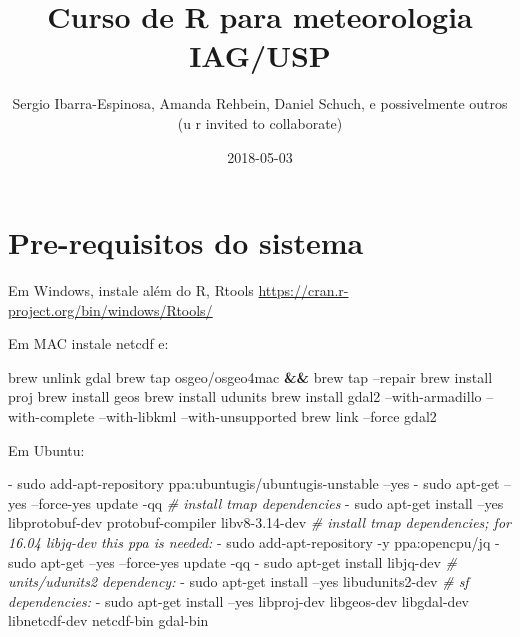 \documentclass[]{book}
\title{Curso de R para meteorologia IAG/USP}
\author{Sergio Ibarra-Espinosa, Amanda Rehbein, Daniel Schuch, e possivelmente
outros (u r invited to collaborate)}
\date{2018-05-03}
\newenvironment{Shaded}{\begin{snugshade}}{\end{snugshade}}
\newcommand{\KeywordTok}[1]{\textcolor[rgb]{0.13,0.29,0.53}{\textbf{#1}}}
\newcommand{\CommentTok}[1]{\textcolor[rgb]{0.56,0.35,0.01}{\textit{#1}}}
\newcommand{\ExtensionTok}[1]{#1}
\newcommand{\NormalTok}[1]{#1}
\begin{document}
\maketitle

{
\setcounter{tocdepth}{1}
\tableofcontents
}
\chapter{Pre-requisitos do sistema}\label{primero}

Em Windows, instale além do R, Rtools
\url{https://cran.r-project.org/bin/windows/Rtools/}

Em MAC instale netcdf e:

\begin{Shaded}
\begin{Highlighting}[]
\ExtensionTok{brew}\NormalTok{ unlink gdal}
\ExtensionTok{brew}\NormalTok{ tap osgeo/osgeo4mac }\KeywordTok{&&} \ExtensionTok{brew}\NormalTok{ tap --repair}
\ExtensionTok{brew}\NormalTok{ install proj}
\ExtensionTok{brew}\NormalTok{ install geos}
\ExtensionTok{brew}\NormalTok{ install udunits}
\ExtensionTok{brew}\NormalTok{ install gdal2 --with-armadillo --with-complete --with-libkml --with-unsupported}
\ExtensionTok{brew}\NormalTok{ link --force gdal2}
\end{Highlighting}
\end{Shaded}

Em Ubuntu:

\begin{Shaded}
\begin{Highlighting}[]
  \ExtensionTok{-}\NormalTok{ sudo add-apt-repository ppa:ubuntugis/ubuntugis-unstable --yes}
  \ExtensionTok{-}\NormalTok{ sudo apt-get --yes --force-yes update -qq}
  \CommentTok{# install tmap dependencies}
  \ExtensionTok{-}\NormalTok{ sudo apt-get install --yes libprotobuf-dev protobuf-compiler libv8-3.14-dev}
  \CommentTok{# install tmap dependencies; for 16.04 libjq-dev this ppa is needed:}
  \ExtensionTok{-}\NormalTok{ sudo add-apt-repository -y ppa:opencpu/jq}
  \ExtensionTok{-}\NormalTok{ sudo apt-get --yes --force-yes update -qq}
  \ExtensionTok{-}\NormalTok{ sudo apt-get install libjq-dev}
  \CommentTok{# units/udunits2 dependency:}
  \ExtensionTok{-}\NormalTok{ sudo apt-get install --yes libudunits2-dev}
  \CommentTok{# sf dependencies:}
  \ExtensionTok{-}\NormalTok{ sudo apt-get install --yes libproj-dev libgeos-dev libgdal-dev libnetcdf-dev  netcdf-bin gdal-bin}
\end{Highlighting}
\end{Shaded}
\end{document}
